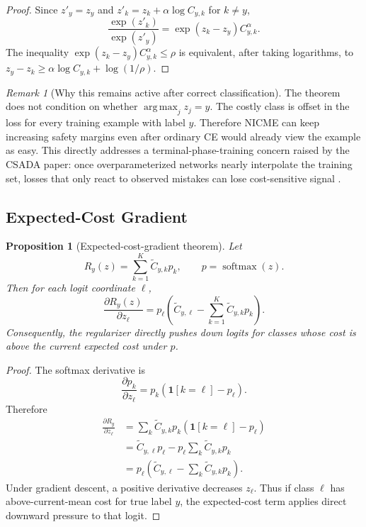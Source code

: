 \documentclass[11pt]{article}
\newcommand{\softmax}{\operatorname{softmax}}
\newcommand{\argmax}{\operatorname*{arg\,max}}
\newcommand{\I}{\mathbf{1}}
\theoremstyle{definition}
\theoremstyle{plain}
\newtheorem{proposition}{Proposition}
\theoremstyle{remark}
\newtheorem{remark}{Remark}
\begin{document}
\begin{proof}
Since $z'_y=z_y$ and $z'_k=z_k+\alpha\log C_{y,k}$ for $k\ne y$,
\begin{equation}
  \frac{\exp(z'_k)}{\exp(z'_y)}
  =
  \exp(z_k-z_y)C_{y,k}^{\alpha}.
\end{equation}
The inequality $\exp(z_k-z_y)C_{y,k}^{\alpha}\le\rho$ is equivalent, after
taking logarithms, to
$z_y-z_k\ge \alpha\log C_{y,k}+\log(1/\rho)$.
\end{proof}

\begin{remark}[Why this remains active after correct classification]
The theorem does not condition on whether $\argmax_j z_j=y$.
The costly class is offset in the loss for every training example with label $y$.
Therefore NICME can keep increasing safety margins even after ordinary CE would already view the example as easy.
This directly addresses a terminal-phase-training concern raised by the CSADA paper: once overparameterized networks nearly interpolate the training set, losses that only react to observed mistakes can lose cost-sensitive signal \cite{chen2025csada}.
\end{remark}

\subsection{Expected-Cost Gradient}

\begin{proposition}[Expected-cost-gradient theorem]
Let
\begin{equation}
  R_y(z)=\sum_{k=1}^{K}\tilde C_{y,k}p_k,
  \qquad p=\softmax(z).
\end{equation}
Then for each logit coordinate $\ell$,
\begin{equation}
  \frac{\partial R_y(z)}{\partial z_\ell}
  =
  p_\ell
  \left(
    \tilde C_{y,\ell}
    -
    \sum_{k=1}^{K}\tilde C_{y,k}p_k
  \right).
  \label{eq:expected-cost-gradient}
\end{equation}
Consequently, the regularizer directly pushes down logits for classes whose cost is above the current expected cost under $p$.
\end{proposition}

\begin{proof}
The softmax derivative is
\begin{equation}
  \frac{\partial p_k}{\partial z_\ell}
  =
  p_k(\I[k=\ell]-p_\ell).
\end{equation}
Therefore
\begin{align}
  \frac{\partial R_y}{\partial z_\ell}
  &=
  \sum_k \tilde C_{y,k}
  p_k(\I[k=\ell]-p_\ell)
  \nonumber\\
  &=
  \tilde C_{y,\ell}p_\ell
  -
  p_\ell\sum_k \tilde C_{y,k}p_k
  \nonumber\\
  &=
  p_\ell
  \left(
    \tilde C_{y,\ell}
    -
    \sum_k \tilde C_{y,k}p_k
  \right).
\end{align}
Under gradient descent, a positive derivative decreases $z_\ell$.
Thus if class $\ell$ has above-current-mean cost for true label $y$, the expected-cost term applies direct downward pressure to that logit.
\end{proof}
\end{document}
